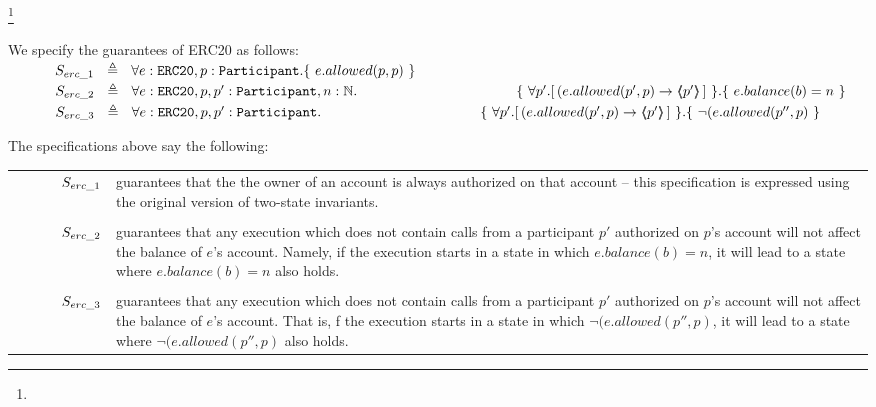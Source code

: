 \footnote{}

We specify the guarantees of   ERC20  as follows:
\\
$\strut \SPSP  S_{erc\_1}\ \  \triangleq \ \ \TwoStatesN{ e:\prg{ERC20},p:\prg{Participant}}  {\  e.allowed(p,p)   \ } $ 
\\
$\strut \SPSP  S_{erc\_2}\ \  \triangleq \ \ \TwoStatesLB{ e:\prg{ERC20},p,p':\prg{Participant},n:\mathbb{N}} 
 {\ \forall p'.[\,(e.allowed(p',p) \rightarrow   \inside{p'}\, ] \ } { \ e.balance(b)=n \ } $ 
\\
$\strut \SPSP  S_{erc\_3}\ \  \triangleq \ \ \TwoStatesLB{ e:\prg{ERC20},p,p':\prg{Participant}}  {\ \forall p'.[\,(e.allowed(p',p) \rightarrow   \inside{p'}\, ] \ } { \ \neg (e.allowed(p'',p) \ } $ 

The specifications above say the following:
\\
\begin{tabular}{ll}
\begin{minipage}{.10\textwidth}
$\strut \ \ \ \ \ \ \ \ \ \   S_{erc\_1}$
\end{minipage}
&
\begin{minipage}{.85\textwidth}
guarantees that the the owner of an account is always authorized on that account -- this specification is expressed using the original version of two-state invariants.
\end{minipage}
\\
\\
\begin{minipage}{.10\textwidth}
$\strut \ \ \ \ \ \ \ \ \ \   S_{erc\_2}$ 
\end{minipage}
&
\begin{minipage}{.85\textwidth}
guarantees that any execution which does not contain calls from a participant $p'$ authorized on $p$'s account will not affect the balance of $e$'s account. Namely, if the execution starts in a state in which $ e.balance(b)=n$, it will lead to a state where $ e.balance(b)=n$ also holds.
\end{minipage}
\\
\\
\begin{minipage}{.10\textwidth}
$\strut \ \ \ \ \ \ \ \ \ \   S_{erc\_3}$ 
\end{minipage}
&
\begin{minipage}{.85\textwidth}
guarantees that any execution which does not contain calls from a participant $p'$ authorized on $p$'s account will not affect the balance of $e$'s account. That is, f the execution starts in a state in which $ \neg (e.allowed(p'',p)$, it will lead to a state where $ \neg (e.allowed(p'',p)$ also holds.
\end{minipage}
\end{tabular}

